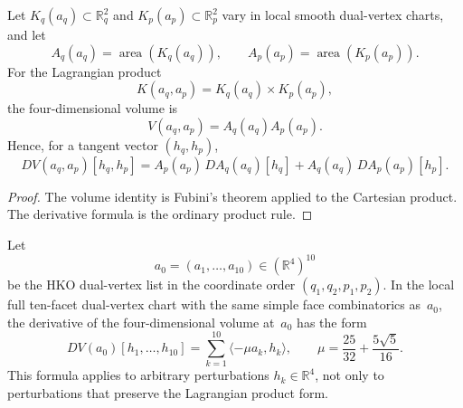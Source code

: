 \begin{lemma}
\label{lem:hko-product-volume-derivative}
Let $K_q(a_q)\subset\mathbb R^2_q$ and
$K_p(a_p)\subset\mathbb R^2_p$ vary in local smooth dual-vertex charts, and
let
\[
  A_q(a_q)=\operatorname{area}(K_q(a_q)),
  \qquad
  A_p(a_p)=\operatorname{area}(K_p(a_p)).
\]
For the Lagrangian product
\[
  K(a_q,a_p)=K_q(a_q)\times K_p(a_p),
\]
the four-dimensional volume is
\[
  V(a_q,a_p)=A_q(a_q)A_p(a_p).
\]
Hence, for a tangent vector $(h_q,h_p)$,
\[
  DV(a_q,a_p)[h_q,h_p]
  =
  A_p(a_p)\,DA_q(a_q)[h_q]
  +
  A_q(a_q)\,DA_p(a_p)[h_p].
\]
\end{lemma}

\begin{proof}
The volume identity is Fubini's theorem applied to the Cartesian product.
The derivative formula is the ordinary product rule.
\end{proof}

\begin{lemma}
\label{lem:hko-full-chart-volume-row}
Let
\[
  a_0=(a_1,\ldots,a_{10})\in(\mathbb R^4)^{10}
\]
be the HKO dual-vertex list in the coordinate order $(q_1,q_2,p_1,p_2)$.
In the local full ten-facet dual-vertex chart with the same simple face
combinatorics as~$a_0$, the derivative of the four-dimensional volume
at~$a_0$ has the form
\[
  DV(a_0)[h_1,\ldots,h_{10}]
  =
  \sum_{k=1}^{10}\langle -\mu a_k,h_k\rangle,
  \qquad
  \mu=\frac{25}{32}+\frac{5\sqrt{5}}{16}.
\]
This formula applies to arbitrary perturbations
$h_k\in\mathbb R^4$, not only to perturbations that preserve the Lagrangian
product form.
\end{lemma}

